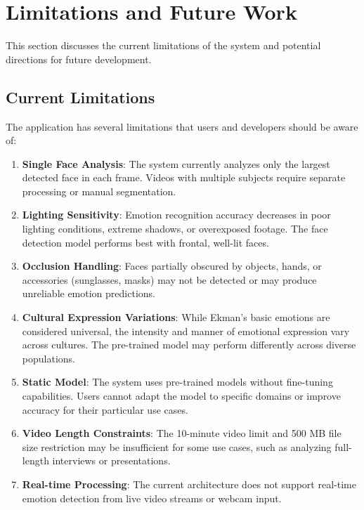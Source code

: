 \section{Limitations and Future Work}
\label{sec:limitations-future-work}

This section discusses the current limitations of the system and potential directions for future development.

\subsection{Current Limitations}

The application has several limitations that users and developers should be aware of:

\begin{enumerate}
    \item \textbf{Single Face Analysis}: The system currently analyzes only the largest detected face in each frame. Videos with multiple subjects require separate processing or manual segmentation.

    \item \textbf{Lighting Sensitivity}: Emotion recognition accuracy decreases in poor lighting conditions, extreme shadows, or overexposed footage. The face detection model performs best with frontal, well-lit faces.

    \item \textbf{Occlusion Handling}: Faces partially obscured by objects, hands, or accessories (sunglasses, masks) may not be detected or may produce unreliable emotion predictions.

    \item \textbf{Cultural Expression Variations}: While Ekman's basic emotions are considered universal, the intensity and manner of emotional expression vary across cultures. The pre-trained model may perform differently across diverse populations.

    \item \textbf{Static Model}: The system uses pre-trained models without fine-tuning capabilities. Users cannot adapt the model to specific domains or improve accuracy for their particular use cases.

    \item \textbf{Video Length Constraints}: The 10-minute video limit and 500 MB file size restriction may be insufficient for some use cases, such as analyzing full-length interviews or presentations.

    \item \textbf{Real-time Processing}: The current architecture does not support real-time emotion detection from live video streams or webcam input.
\end{enumerate}

